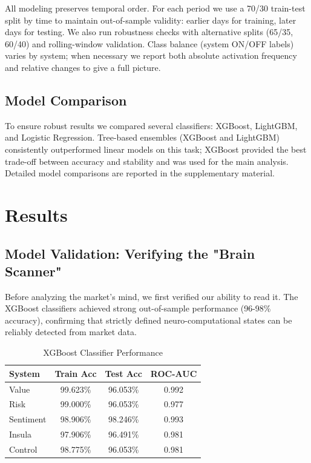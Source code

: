 \documentclass[conference]{IEEEtran}
\begin{document}
All modeling preserves temporal order. For each period we use a 70/30 train-test split by time to maintain out-of-sample validity: earlier days for training, later days for testing. We also run robustness checks with alternative splits (65/35, 60/40) and rolling-window validation. Class balance (system ON/OFF labels) varies by system; when necessary we report both absolute activation frequency and relative changes to give a full picture.

\subsection{Model Comparison}

To ensure robust results we compared several classifiers: XGBoost, LightGBM, and Logistic Regression. Tree-based ensembles (XGBoost and LightGBM) consistently outperformed linear models on this task; XGBoost provided the best trade-off between accuracy and stability and was used for the main analysis. Detailed model comparisons are reported in the supplementary material.
\section{Results}

\subsection{Model Validation: Verifying the "Brain Scanner"}

Before analyzing the market's mind, we first verified our ability to read it. The XGBoost classifiers achieved strong out-of-sample performance (96-98\% accuracy), confirming that strictly defined neuro-computational states can be reliably detected from market data.

\begin{table}[htbp]
\centering
\caption{XGBoost Classifier Performance}
\label{tab:performance}
\small
\begin{tabular}{@{}lccc@{}}
\toprule
\textbf{System} & \textbf{Train Acc} & \textbf{Test Acc} & \textbf{ROC-AUC} \\
\midrule
Value & 99.623\% & 96.053\% & 0.992 \\
Risk & 99.000\% & 96.053\% & 0.977 \\
Sentiment & 98.906\% & 98.246\% & 0.993 \\
Insula & 97.906\% & 96.491\% & 0.981 \\
Control & 98.775\% & 96.053\% & 0.981 \\
\bottomrule
\end{tabular}
\end{table}
\end{document}
